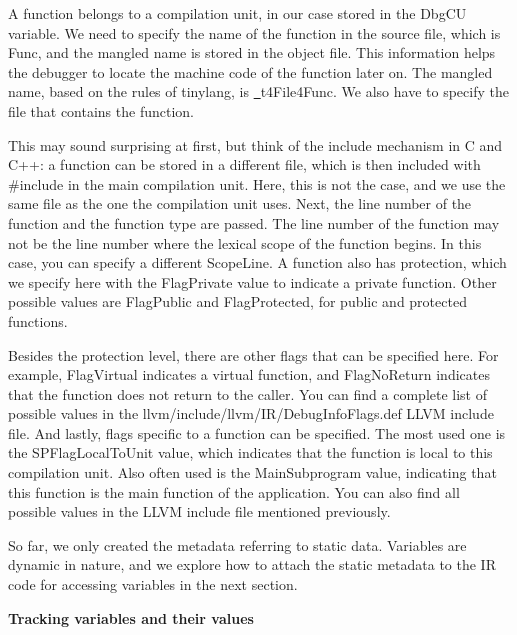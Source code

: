 A function belongs to a compilation unit, in our case stored in the DbgCU variable. We need to specify the name of the function in the source file, which is Func, and the mangled name is stored in the object file. This information helps the debugger to locate the machine code of the function later on. The mangled name, based on the rules of tinylang, is \underline{~}t4File4Func. We also have to specify the file that contains the function.\par

This may sound surprising at first, but think of the include mechanism in C and C++: a function can be stored in a different file, which is then included with \#include in the main compilation unit. Here, this is not the case, and we use the same file as the one the compilation unit uses. Next, the line number of the function and the function type are passed. The line number of the function may not be the line number where the lexical scope of the function begins. In this case, you can specify a different ScopeLine. A function also has protection, which we specify here with the FlagPrivate value to indicate a private function. Other possible values are FlagPublic and FlagProtected, for public and protected functions.\par

Besides the protection level, there are other flags that can be specified here. For example, FlagVirtual indicates a virtual function, and FlagNoReturn indicates that the function does not return to the caller. You can find a complete list of possible values in the llvm/include/llvm/IR/DebugInfoFlags.def LLVM include file. And lastly, flags specific to a function can be specified. The most used one is the SPFlagLocalToUnit value, which indicates that the function is local to this compilation unit. Also often used is the MainSubprogram value, indicating that this function is the main function of the application. You can also find all possible values in the LLVM include file mentioned previously.\par

So far, we only created the metadata referring to static data. Variables are dynamic in nature, and we explore how to attach the static metadata to the IR code for accessing variables in the next section.\par

\hspace*{\fill} \par %
\textbf{Tracking variables and their values}


